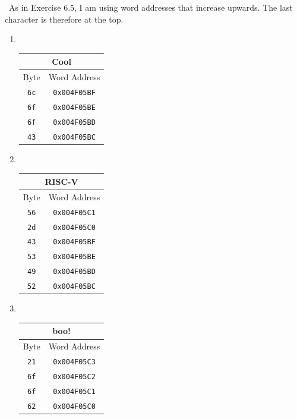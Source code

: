 \documentclass[12pt]{article}
\newenvironment{sol}[1][Solution]{\begin{trivlist}
		\item[\hskip \labelsep {\bfseries #1:}]}{\end{trivlist}}
\begin{document}
\begin{sol}
	\
	As in Exercise 6.5, I am using  word addresses that increase upwards. The last character is therefore at the top.
	\begin{enumerate}[label=(\alph*)]
		\item 
		\
		\begin{center}
			\begin{tabular}{cc}
				\multicolumn{2}{c}{Cool}\\
				\hline
				Byte & Word Address\\
				\hline
				\texttt{6c} & \texttt{0x004F05BF}\\
				\texttt{6f} & \texttt{0x004F05BE}\\
				\texttt{6f} & \texttt{0x004F05BD}\\
				\texttt{43} & \texttt{0x004F05BC}
			\end{tabular}
		\end{center}
		\item 
		\
		\begin{center}
			\begin{tabular}{cc}
				\multicolumn{2}{c}{RISC-V}\\
				\hline
				Byte & Word Address\\
				\hline
				\texttt{56} & \texttt{0x004F05C1}\\
				\texttt{2d} & \texttt{0x004F05C0}\\
				\texttt{43} & \texttt{0x004F05BF}\\
				\texttt{53} & \texttt{0x004F05BE}\\
				\texttt{49} & \texttt{0x004F05BD}\\
				\texttt{52} & \texttt{0x004F05BC}
			\end{tabular}
		\end{center}
		\item 
		\
		\begin{center}
			\begin{tabular}{cc}
				\multicolumn{2}{c}{boo!}\\
				\hline
				Byte & Word Address\\
				\hline
				\texttt{21} & \texttt{0x004F05C3}\\
				\texttt{6f} & \texttt{0x004F05C2}\\
				\texttt{6f} & \texttt{0x004F05C1}\\
				\texttt{62} & \texttt{0x004F05C0}
			\end{tabular}
		\end{center}
	\end{enumerate}
\end{sol}
\end{document}
